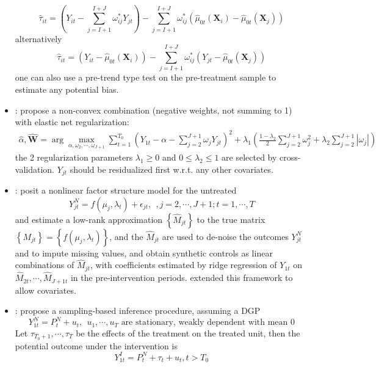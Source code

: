 \documentclass[twoside]{article}
\begin{document}
\begin{itemize}
    $$ \hat{\tau}_{it} = \left( Y_{it} - \sum^{I+J}_{j=I+1}\omega^*_{ij}Y_{jt} \right) - \sum^{I+J}_{j=I+1}\omega^*_{ij}\left(\hat{\mu}_{0t}\left(\mathbf{X}_i\right)-\hat{\mu}_{0t}\left(\mathbf{X}_j\right)\right) $$ alternatively 
    $$ \hat{\tau}_{it} = \left(Y_{it}-\hat{\mu}_{0t}\left(\mathbf{X}_i\right)\right) - \sum^{I+J}_{j=I+1}\omega^*_{ij}\left(Y_{jt}-\hat{\mu}_{0t}\left(\mathbf{X}_j\right)\right) $$
    one can also use a pre-trend type test on the pre-treatment sample to estimate any potential bias.
    \item {}: \citet{doudchenko2016balancing} propose a non-convex combination (negative weights, not summing to 1) with elastic net regularization:
    \begin{align*}
        \hat{\alpha},\hat{\mathbf{W}} = \arg\max_{\alpha,\omega_2,\cdots,\omega_{J+1}} \sum^{T_0}_{t=1} \left( Y_{1t} - \alpha - \sum^{J+1}_{j=2}\omega_jY_{jt} \right)^2 + \lambda_1 \left(\frac{1-\lambda_2}{2}\sum^{J+1}_{j=2}\omega^2_j + \lambda_2 \sum^{J+1}_{j=2}\left\vert \omega_j \right\vert\right)
    \end{align*}
    the 2 regularization parameters $\lambda_1\geq 0$ and $0\leq \lambda_2\leq 1$ are selected by cross-validation. $Y_{jt}$ should be residualized first w.r.t. any other covariates.
    \item {}: \citet{amjad2018robust} posit a nonlinear factor structure model for the untreated $$ Y^N_{jt} = f\left(\mu_j,\lambda_t\right) +\epsilon_{jt},\ \ ,j=2,\cdots,J+1;t=1,\cdots,T$$
    and estimate a low-rank approximation $\left\{\hat{M}_{jt}\right\}$ to the true matrix $\left\{M_{jt}\right\} = \left\{f(\mu_j,\lambda_t)\right\}$, and the $\hat{M}_{jt}$ are used to de-noise the outcomes $Y^N_{jt}$ and to impute missing values, and obtain synthetic controls as linear combinations of $\hat{M}_{jt}$, with coefficients estimated by ridge regression of $Y_{1t}$ on $\hat{M}_{2t},\cdots,\hat{M}_{J+1t}$ in the pre-intervention periods. \citet{amjad2019mrsc} extended this framework to allow covariates.
    \item {}: \citet{chernozhukov2021exact} propose a sampling-based inference procedure, assuming a DGP $$ Y^N_{1t} = P^N_t+u_t,\ \ u_1,\cdots,u_T\text{ are stationary, weakly dependent with mean 0} $$
    Let $\tau_{T_0+1},\cdots,\tau_T$ be the effects of the treatment on the treated unit, then the potential outcome under the intervention is $$ Y^I_{1t}=P^N_{t}+\tau_t+u_t, t>T_0$$

\end{itemize}
\end{document}
